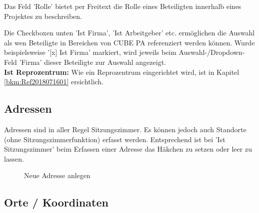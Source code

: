 Das Feld 'Rolle' bietet per Freitext die Rolle eines Beteiligten innerhalb eines Projektes zu beschreiben. 

\vspace{\baselineskip}

Die Checkboxen unten 'Ist Firma', 'Ist Arbeitgeber' etc. ermöglichen die Auswahl als wen Beteiligte in Bereichen von CUBE PA referenziert werden können. Wurde beispielsweise '[x] Ist Firma' markiert, wird jeweils beim Auswahl-/Dropdown-Feld 'Firma' dieser Beteiligte zur Auswahl angezeigt.\\

\textbf{Ist Reprozentrum:} Wie ein Reprozentrum eingerichtet wird, ist in Kapitel \ref{bkm:Ref2018071601} ersichtlich.

\vspace{\baselineskip}
\vspace{\baselineskip}
\vspace{\baselineskip}

\pagebreak
\subsection{Adressen}

Adressen sind in aller Regel Sitzungszimmer. Es können jedoch auch Standorte (ohne Sitzungszimmerfunktion) erfasst werden. Entsprechend ist bei 'Ist Sitzungszimmer' beim Erfassen einer Adresse das Häkchen zu setzen oder leer zu lassen.

\begin{figure}[H]
\caption{Neue Adresse anlegen}
\end{figure}

\subsection{Orte / Koordinaten}

